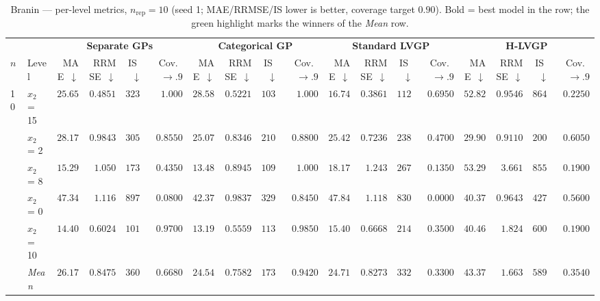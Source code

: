 \begin{table}[htbp]
\centering
\scriptsize
\setlength{\tabcolsep}{2.5pt}
\setlength{\fboxsep}{1pt}
\caption{Branin --- per-level metrics, $n_{\mathrm{rep}}=10$ (seed 1; MAE/RRMSE/IS lower is better, coverage target $0.90$). Bold = best model in the row; the green highlight marks the winners of the \emph{Mean} row.}
\label{tab:branin_hetero_nrep10}
\begin{tabular}{llrrrrrrrrrrrrrrrr}
\toprule
 & & \multicolumn{4}{c}{\textbf{Separate GPs}} & \multicolumn{4}{c}{\textbf{Categorical GP}} & \multicolumn{4}{c}{\textbf{Standard LVGP}} & \multicolumn{4}{c}{\textbf{H-LVGP}} \\
\cmidrule(lr){3-6} \cmidrule(lr){7-10} \cmidrule(lr){11-14} \cmidrule(lr){15-18}
$n$ & Level & MAE~$\downarrow$ & RRMSE~$\downarrow$ & IS~$\downarrow$ & Cov.~$\to.9$ & MAE~$\downarrow$ & RRMSE~$\downarrow$ & IS~$\downarrow$ & Cov.~$\to.9$ & MAE~$\downarrow$ & RRMSE~$\downarrow$ & IS~$\downarrow$ & Cov.~$\to.9$ & MAE~$\downarrow$ & RRMSE~$\downarrow$ & IS~$\downarrow$ & Cov.~$\to.9$ \\
\midrule
\multirow{6}{*}{10} & $x_2$ = 15 & $25.65$ & $0.4851$ & $323.4$ & {\boldmath$1.000$} & $28.58$ & $0.5221$ & {\boldmath$103.9$} & $1.000$ & {\boldmath$16.74$} & {\boldmath$0.3861$} & $112.3$ & $0.6950$ & $52.82$ & $0.9546$ & $864.8$ & $0.2250$ \\
 & $x_2$ = 2 & $28.17$ & $0.9843$ & $305.5$ & $0.8550$ & {\boldmath$25.07$} & $0.8346$ & $210.5$ & {\boldmath$0.8800$} & $25.42$ & {\boldmath$0.7236$} & $238.0$ & $0.4700$ & $29.90$ & $0.9110$ & {\boldmath$200.5$} & $0.6050$ \\
 & $x_2$ = 8 & $15.29$ & $1.050$ & $173.9$ & $0.4350$ & {\boldmath$13.48$} & {\boldmath$0.8945$} & {\boldmath$109.9$} & {\boldmath$1.000$} & $18.17$ & $1.243$ & $267.8$ & $0.1350$ & $53.29$ & $3.661$ & $855.1$ & $0.1900$ \\
 & $x_2$ = 0 & $47.34$ & $1.116$ & $897.1$ & $0.0800$ & $42.37$ & $0.9837$ & {\boldmath$329.6$} & {\boldmath$0.8450$} & $47.84$ & $1.118$ & $830.0$ & $0.0000$ & {\boldmath$40.37$} & {\boldmath$0.9643$} & $427.8$ & $0.5600$ \\
 & $x_2$ = 10 & $14.40$ & $0.6024$ & {\boldmath$101.4$} & {\boldmath$0.9700$} & {\boldmath$13.19$} & {\boldmath$0.5559$} & $113.9$ & $0.9850$ & $15.40$ & $0.6668$ & $214.7$ & $0.3500$ & $40.46$ & $1.824$ & $600.5$ & $0.1900$ \\
 & \textit{Mean} & $26.17$ & $0.8475$ & $360.3$ & $0.6680$ & \colorbox{green!20}{\boldmath$24.54$} & \colorbox{green!20}{\boldmath$0.7582$} & \colorbox{green!20}{\boldmath$173.5$} & \colorbox{green!20}{\boldmath$0.9420$} & $24.71$ & $0.8273$ & $332.6$ & $0.3300$ & $43.37$ & $1.663$ & $589.7$ & $0.3540$ \\

\end{tabular}
\end{table}
